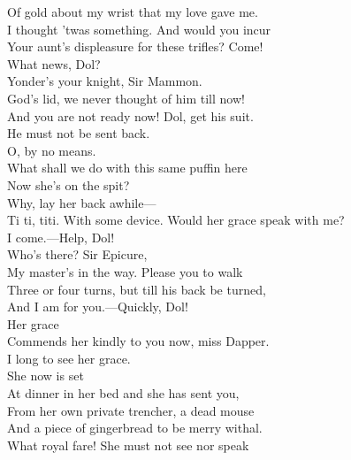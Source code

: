\documentclass[a4paper,oneside,12pt]{memoir}
\begin{document}
\begin{drama*}
Of gold about my wrist that my love gave me.\\
\facespeaks I thought 'twas something. And would you incur\\
Your aunt's displeasure for these trifles? Come!\\
\subtlespeaks What news, Dol?\\
\dolspeaks {} Yonder's your knight, Sir Mammon.\\
\facespeaks God's lid, we never thought of him till now!\\
\subtlespeaks And you are not ready now! Dol, get his suit.\\
He must not be sent back.\\
\facespeaks {} O, by no means.\\
What shall we do with this same puffin here\\
Now she's on the spit?\\
\subtlespeaks {} Why, lay her back awhile---\\
\dolspeaks Ti ti, titi.
\subtlespeaks With some device. Would her grace speak with me?\\
I come.---Help, Dol!\\
\facespeaks {}  Who's there? Sir Epicure,\\
My master's in the way. Please you to walk\\
Three or four turns, but till his back be turned,\\
And I am for you.---Quickly, Dol!\\
\subtlespeaks {} Her grace\\
Commends her kindly to you now, miss Dapper.\\
\dapperspeaks I long to see her grace.\\
\subtlespeaks {} She now is set\\
At dinner in her bed and she has sent you,\\
From her own private trencher, a dead mouse\\
And a piece of gingerbread to be merry withal.\\
\facespeaks What royal fare!
\subtlespeaks {} She must not see nor speak\\

\end{drama*}
\end{document}
